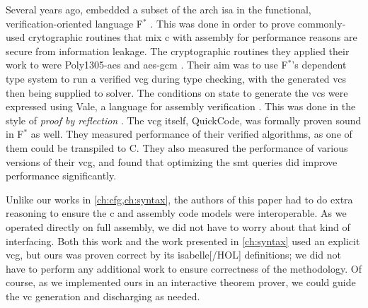 Several years ago, \textcite{fromherz2019verified} embedded a subset
of the \gls{arch} \ac{isa} in the functional, verification-oriented language
F$^*$ \autocite{fstar}.
This was done in order to prove commonly-used crytographic routines
that mix \gls{c} with assembly for performance reasons are secure from information leakage.
The cryptographic routines they applied their work to were
Poly1305-\ac{aes} \autocite{bernstein2005poly1305} and
\ac{aes}-\ac{gcm} \autocite{dworkin2007recommendation}.
Their aim was to use F$^*$'s dependent type system to run a verified \ac{vcg}
during type checking, with the generated \acp{vc}
then being supplied to  solver.
The conditions on state to generate the \acp{vc} were expressed using Vale,
a language for assembly verification \autocite{bond2017vale}.
This was done in the style of \emph{proof by reflection} \autocite{bertot2004reflection}.
The \ac{vcg} itself, QuickCode, was formally proven sound in F$^*$ as well.
They measured performance of their verified algorithms, as one of them could be
transpiled to C. They also measured the performance of various versions
of their \ac{vcg}, and found that optimizing the \ac{smt} queries did improve performance
significantly.

Unlike our works in \cref{ch:cfg,ch:syntax}, the authors of this paper
had to do extra reasoning to ensure the \gls{c} and assembly code models were interoperable.
As we operated directly on full assembly, we did not have to worry about
that kind of interfacing. Both this work and the work presented in \cref{ch:syntax} used an explicit \ac{vcg},
but ours was proven correct by its \gls{isabelle}[/HOL] definitions;
we did not have to perform any additional work to ensure correctness
of the methodology.
Of course, as we implemented ours in an interactive theorem prover,
we could guide the \ac{vc} generation and discharging as needed.

